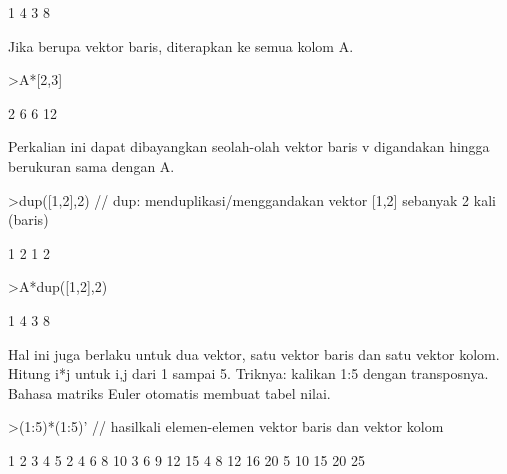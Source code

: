 \documentclass[a4paper,10pt]{article}
\begin{document}
\begin{eulernotebook}
\begin{eulercomment}
\begin{eulercomment}
\begin{eulercomment}
\begin{eulercomment}
\begin{eulercomment}
\begin{eulercomment}
\begin{eulercomment}
\begin{eulercomment}
\begin{eulercomment}
\begin{eulercomment}
\begin{eulercomment}
\begin{eulercomment}
\begin{euleroutput}
              1             4 
              3             8 
\end{euleroutput}
\begin{eulercomment}
Jika berupa vektor baris, diterapkan ke semua kolom A.
\end{eulercomment}
\begin{eulerprompt}
>A*[2,3]
\end{eulerprompt}
\begin{euleroutput}
              2             6 
              6            12 
\end{euleroutput}
\begin{eulercomment}
Perkalian ini dapat dibayangkan seolah-olah vektor baris v digandakan
hingga berukuran sama dengan A.
\end{eulercomment}
\begin{eulerprompt}
>dup([1,2],2) // dup: menduplikasi/menggandakan vektor [1,2] sebanyak 2 kali (baris)
\end{eulerprompt}
\begin{euleroutput}
              1             2 
              1             2 
\end{euleroutput}
\begin{eulerprompt}
>A*dup([1,2],2)
\end{eulerprompt}
\begin{euleroutput}
              1             4 
              3             8 
\end{euleroutput}
\begin{eulercomment}
Hal ini juga berlaku untuk dua vektor, satu vektor baris dan satu vektor
kolom. Hitung i*j untuk i,j dari 1 sampai 5. Triknya: kalikan 1:5 dengan
transposnya. Bahasa matriks Euler otomatis membuat tabel nilai.
\end{eulercomment}
\begin{eulerprompt}
>(1:5)*(1:5)' // hasilkali elemen-elemen vektor baris dan vektor kolom
\end{eulerprompt}
\begin{euleroutput}
              1             2             3             4             5 
              2             4             6             8            10 
              3             6             9            12            15 
              4             8            12            16            20 
              5            10            15            20            25 
\end{euleroutput}
\begin{eulercomment}

\end{eulercomment}
\end{eulercomment}
\end{eulercomment}
\end{eulercomment}
\end{eulercomment}
\end{eulercomment}
\end{eulercomment}
\end{eulercomment}
\end{eulercomment}
\end{eulercomment}
\end{eulercomment}
\end{eulercomment}
\end{eulercomment}
\end{eulernotebook}
\end{document}
